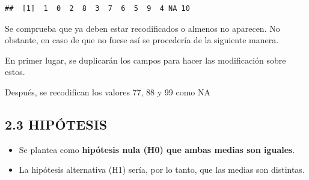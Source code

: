 \documentclass[
  12 pt,
  a4paper,
]{article}
\newenvironment{Shaded}{\begin{snugshade}}{\end{snugshade}}
\newcommand{\ConstantTok}[1]{\textcolor[rgb]{0.56,0.35,0.01}{#1}}
\newcommand{\DecValTok}[1]{\textcolor[rgb]{0.00,0.00,0.81}{#1}}
\newcommand{\NormalTok}[1]{#1}
\newcommand{\OtherTok}[1]{\textcolor[rgb]{0.56,0.35,0.01}{#1}}
\newcommand{\SpecialCharTok}[1]{\textcolor[rgb]{0.81,0.36,0.00}{\textbf{#1}}}
\providecommand{\tightlist}{%
  \setlength{\itemsep}{0pt}\setlength{\parskip}{0pt}}
\begin{document}
\begin{verbatim}
##  [1]  1  0  2  8  3  7  6  5  9  4 NA 10
\end{verbatim}

Se comprueba que ya deben estar recodificados o almenos no aparecen. No
obstante, en caso de que no fuese así se procedería de la siguiente
manera.

En primer lugar, se duplicarán los campos para hacer las modificación
sobre estos.

\begin{Shaded}
\end{Shaded}

Después, se recodifican los valores 77, 88 y 99 como NA

\begin{Shaded}
\end{Shaded}

\subsection{2.3 HIPÓTESIS}\label{hipuxf3tesis}

\begin{itemize}
\tightlist
\item
  Se plantea como \textbf{hipótesis nula (H0) que ambas medias son
  iguales}.
\item
  La hipótesis alternativa (H1) sería, por lo tanto, que las medias son
  distintas.
\end{itemize}
\end{document}
